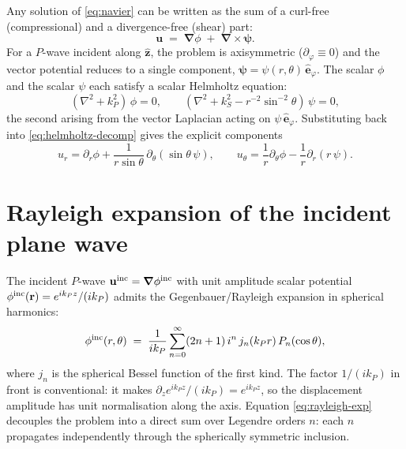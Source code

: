 \documentclass[11pt,a4paper]{article}
\newcommand{\bu}{\mathbf{u}}
\newcommand{\br}{\mathbf{r}}
\newcommand{\bnabla}{\boldsymbol{\nabla}}
\newcommand{\bpsi}{\boldsymbol{\psi}}
\newcommand{\hatphi}{\hat{\mathbf{e}}_\varphi}
\begin{document}
Any solution of \eqref{eq:navier} can be written as the sum of a
curl-free (compressional) and a divergence-free (shear) part:
\begin{equation}
\bu \;=\; \bnabla\phi \;+\; \bnabla\!\times\!\bpsi.
\label{eq:helmholtz-decomp}
\end{equation}
For a $P$-wave incident along $\hat{\mathbf z}$, the problem is
axisymmetric ($\partial_\varphi\equiv 0$) and the vector potential
reduces to a single component, $\bpsi=\psi(r,\theta)\,\hatphi$.  The
scalar $\phi$ and the scalar $\psi$ each satisfy a scalar Helmholtz
equation:
\begin{equation}
(\nabla^2 + k_P^2)\,\phi = 0, \qquad
(\nabla^2 + k_S^2 - r^{-2}\sin^{-2}\theta)\,\psi = 0,
\label{eq:helmholtz-scalar}
\end{equation}
the second arising from the vector Laplacian acting on
$\psi\,\hatphi$.  Substituting back into \eqref{eq:helmholtz-decomp}
gives the explicit components
\begin{equation}
u_r = \partial_r\phi + \frac{1}{r\sin\theta}\,\partial_\theta(\sin\theta\,\psi),
\qquad
u_\theta = \frac{1}{r}\partial_\theta\phi - \frac{1}{r}\partial_r(r\,\psi).
\label{eq:u-from-pot}
\end{equation}

\section{Rayleigh expansion of the incident plane wave}
\label{sec:rayleigh}

The incident $P$-wave $\bu^{\rm inc}=\bnabla\phi^{\rm inc}$ with unit
amplitude scalar potential
$\phi^{\rm inc}(\br)=e^{ik_P z}/(ik_P)$ admits the
Gegenbauer/Rayleigh expansion in spherical harmonics:
\begin{equation}
\phi^{\rm inc}(r,\theta) \;=\; \frac{1}{ik_P}
\sum_{n=0}^{\infty}(2n+1)\,i^n\,j_n(k_P r)\,P_n(\cos\theta),
\label{eq:rayleigh-exp}
\end{equation}
where $j_n$ is the spherical Bessel function of the first kind.  The
factor $1/(ik_P)$ in front is conventional: it makes
$\partial_z e^{ik_P z}/(ik_P) = e^{ik_P z}$, so the displacement
amplitude has unit normalisation along the axis.  Equation
\eqref{eq:rayleigh-exp} decouples the problem into a direct sum over
Legendre orders $n$: each $n$ propagates independently through the
spherically symmetric inclusion.
\end{document}
